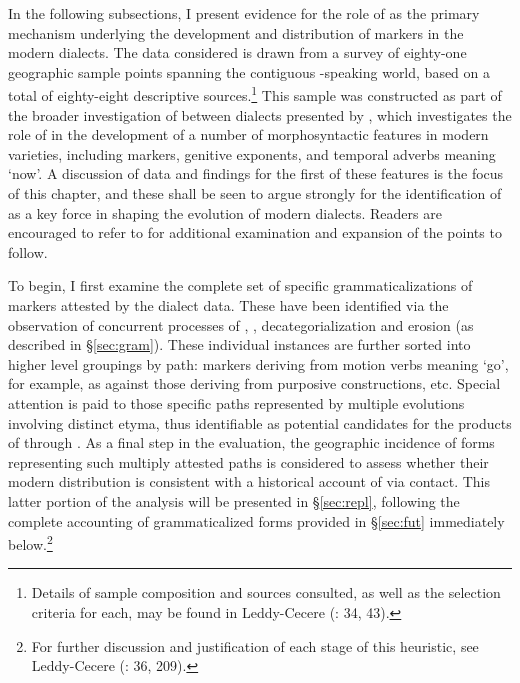\documentclass[output=paper]{langsci/langscibook}
\begin{document}
In the following subsections, I present evidence for the role of  as the primary mechanism underlying the development and distribution of   markers in the modern  dialects. The data considered is drawn from a survey of eighty-one geographic sample points spanning the contiguous -speaking world, based on a total of eighty-eight descriptive sources.\footnote{Details of sample composition and sources consulted, as well as the selection criteria for each,  may be found in Leddy-Cecere (\citeyear{Leddy-Cecere2018}: 34, 43).} This sample was constructed as part of the broader investigation of  between  dialects presented by \citet{Leddy-Cecere2018}, which investigates the role of  in the development of a number of morphosyntactic features in modern  varieties, including   markers, genitive exponents, and temporal adverbs meaning ‘now’. A discussion of data and findings for the first of these features is the focus of this chapter, and these shall be seen to argue strongly for the identification of  as a key force in shaping the evolution of modern  dialects.  Readers are encouraged to refer to \citet{Leddy-Cecere2018} for additional examination and expansion of the points to follow.

To begin, I first examine the complete set of specific grammaticalizations of   markers attested by the  dialect data. These have been identified via the observation of concurrent processes of , , decategorialization and erosion (as described in §\ref{sec:gram}). These individual instances are further sorted into higher level groupings by  path:   markers deriving from motion verbs meaning ‘go’, for example, as against those deriving from purposive constructions, etc. Special attention is paid to those specific  paths represented by multiple evolutions involving distinct etyma, thus identifiable as potential candidates for the products of  through . As a final step in the evaluation, the geographic incidence of forms representing such multiply attested paths is considered to assess whether their modern distribution is consistent with a historical account of  via contact. This latter portion of the analysis will be presented in §\ref{sec:repl}, following the complete accounting of grammaticalized forms provided in §\ref{sec:fut} immediately below.\footnote{For further discussion and justification of each stage of this heuristic, see Leddy-Cecere (\citeyear{Leddy-Cecere2018}: 36, 209).}
\end{document}
